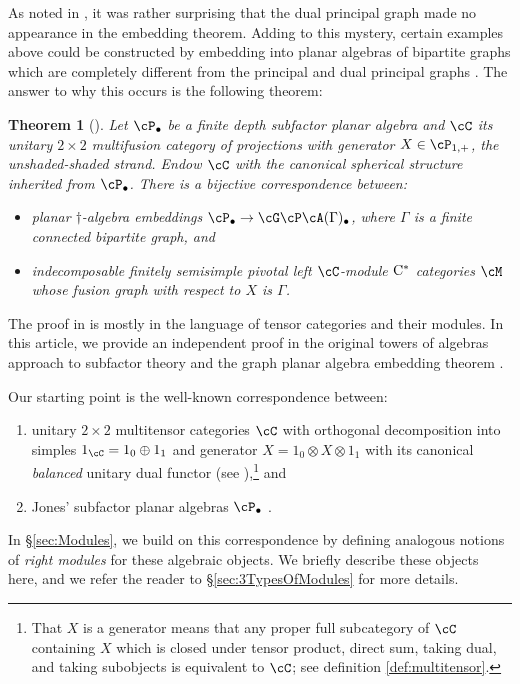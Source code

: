\documentclass[11pt]{article}
\theoremstyle{plain}
\newtheorem{thm}{Theorem}[section]
\theoremstyle{definition}
\newcommand{\Cstar}{\rm{C^*}}
\begin{document}
As noted in \cite{MR2812459}, it was rather surprising that the dual principal graph made no appearance in the embedding theorem.
Adding to this mystery, certain examples above could be constructed by embedding into planar algebras of bipartite graphs which are completely different from the principal and dual principal graphs \cite{MR2679382,MR3402358,EH3}.
The answer to why this occurs is the following theorem:

\begin{thm}[\cite{EH3}]
Let $\cP_\bullet$ be a finite depth subfactor planar algebra and $\cC$ its unitary $2\times 2$ multifusion category of projections with generator $X \in \cP_{1,+}$, the unshaded-shaded strand.
Endow $\cC$ with the canonical spherical structure inherited from $\cP_\bullet$.
There is a bijective correspondence between:
\begin{itemize}
\item
planar $\dag$-algebra embeddings $\cP_\bullet \to \cG\cP\cA(\Gamma)_\bullet$, where $\Gamma$ is a finite connected bipartite graph, and 
\item
indecomposable finitely semisimple pivotal left $\cC$-module $\Cstar$ categories $\cM$ whose fusion graph with respect to $X$ is $\Gamma$.
\end{itemize}
\end{thm}

The proof in \cite{EH3} is mostly in the language of tensor categories and their modules.
In this article, we provide an independent proof in the original towers of algebras approach to subfactor theory \cite{MR936086,MR999799,MR1278111} and the graph planar algebra embedding theorem \cite{MR2812459}.

Our starting point is the well-known correspondence between:
\begin{enumerate}[label={\rm(\arabic*)}]
\item
unitary $2\times 2$ multitensor categories $\cC$ with orthogonal decomposition into simples $1_\cC = 1_0 \oplus 1_1$ and generator $X = 1_0 \otimes X \otimes 1_1$ with its canonical \emph{balanced} unitary dual functor
(see \cite{MR2091457,1808.00323}),\footnote{
	That $X$ is a generator means that any proper full subcategory of $\cC$ containing $X$ which is closed under tensor product, direct sum, taking dual, and taking subobjects is equivalent to $\cC$; see definition \ref{def:multitensor}. 
} 
and
\item
Jones' subfactor planar algebras $\cP_\bullet$ \cite{math.QA/9909027}.
\end{enumerate}
In \S\ref{sec:Modules}, we build on this correspondence by defining analogous notions of \emph{right modules} for these algebraic objects.
We briefly describe these objects here, and we refer the reader to \S\ref{sec:3TypesOfModules} for more details.
\end{document}

